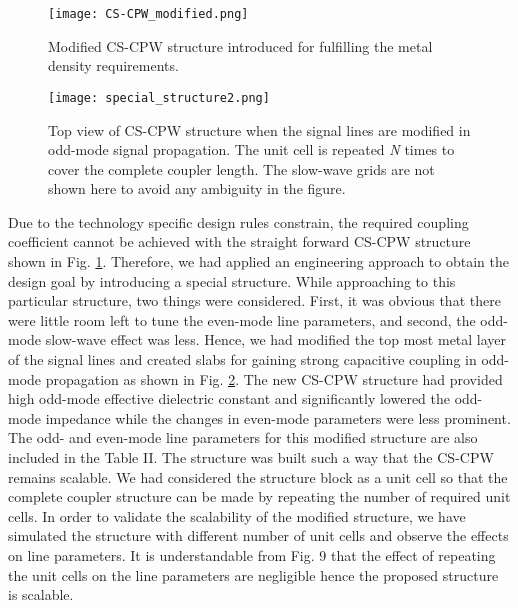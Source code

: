 \documentclass[journal]{IEEEtran}
\begin{document}
\begin{figure}
	\texttt{[image: CS-CPW\_modified.png]}
	\caption{Modified CS-CPW structure introduced for fulfilling the metal density requirements.}
	\label{GCPW}
\end{figure}

\begin{figure}
	\texttt{[image: special\_structure2.png]}
	\caption{Top view of CS-CPW structure when the signal lines are modified in odd-mode signal propagation. The unit cell is repeated \textit{N} times to cover the complete coupler length. The slow-wave grids are not shown here to avoid any ambiguity in the figure.}
	\label{special_structure}
\end{figure}


Due to the technology specific design rules constrain, the required coupling coefficient cannot be achieved with the straight forward CS-CPW structure shown in Fig. \ref{GCPW}. Therefore, we had applied an engineering approach to obtain the design goal by introducing a special structure. While approaching to this particular structure, two things were considered. First, it was obvious that there were little room left to tune the even-mode line parameters, and second, the odd-mode slow-wave effect was less. Hence, we had modified the top most metal layer of the signal lines and created slabs for gaining strong capacitive coupling in odd-mode propagation as shown in Fig. \ref{special_structure}. The new CS-CPW structure had provided high odd-mode effective dielectric constant and significantly lowered the odd-mode impedance while the changes in even-mode parameters were less prominent. The odd- and even-mode line parameters for this modified structure are also included in the Table II. The structure was built such a way that the CS-CPW remains scalable. We had considered the structure block as a unit cell so that the complete coupler structure can be made by repeating the number of
required unit cells. In order to validate the scalability of the modified structure, we have simulated the structure with different number of unit cells and observe the effects on line parameters. It is understandable from Fig. 9 that the effect of repeating the unit cells on the line parameters are negligible hence the proposed structure is scalable.
\end{document}

